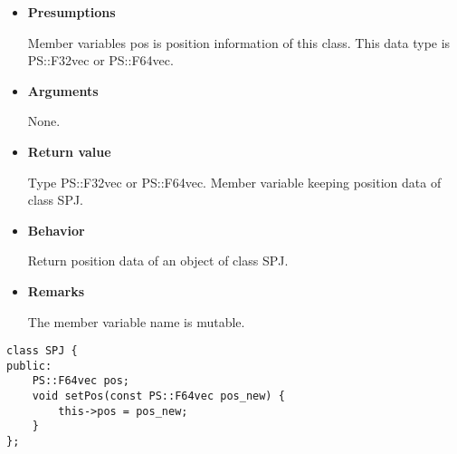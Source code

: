 \begin{itemize}

\item {\bf Presumptions}
  
  Member variables pos is position information of this class. This
  data type is PS::F32vec or PS::F64vec.
  
\item {\bf Arguments}

  None.
  
\item {\bf Return value}

  Type PS::F32vec or PS::F64vec. Member variable keeping position data
  of class SPJ.
  
\item {\bf Behavior}

  Return position data of an object of class SPJ.
  
\item {\bf Remarks}

  The member variable name is mutable.

\end{itemize}


\begin{screen}
\begin{verbatim}
class SPJ {
public:
    PS::F64vec pos;
    void setPos(const PS::F64vec pos_new) {
        this->pos = pos_new;
    }
};
\end{verbatim}
\end{screen}

